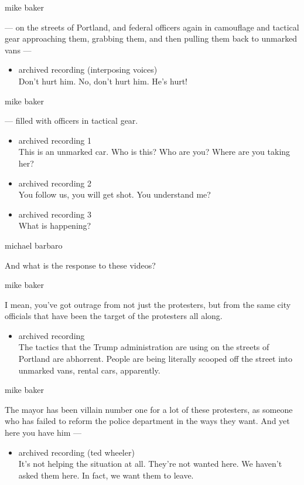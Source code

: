 mike baker

--- on the streets of Portland, and federal officers again in camouflage
and tactical gear approaching them, grabbing them, and then pulling them
back to unmarked vans ---

\begin{itemize}
\tightlist
\item
  archived recording (interposing voices)\\
  Don't hurt him. No, don't hurt him. He's hurt!
\end{itemize}

mike baker

--- filled with officers in tactical gear.

\begin{itemize}
\item
  archived recording 1\\
  This is an unmarked car. Who is this? Who are you? Where are you
  taking her?
\item
  archived recording 2\\
  You follow us, you will get shot. You understand me?
\item
  archived recording 3\\
  What is happening?
\end{itemize}

michael barbaro

And what is the response to these videos?

mike baker

I mean, you've got outrage from not just the protesters, but from the
same city officials that have been the target of the protesters all
along.

\begin{itemize}
\tightlist
\item
  archived recording\\
  The tactics that the Trump administration are using on the streets of
  Portland are abhorrent. People are being literally scooped off the
  street into unmarked vans, rental cars, apparently.
\end{itemize}

mike baker

The mayor has been villain number one for a lot of these protesters, as
someone who has failed to reform the police department in the ways they
want. And yet here you have him ---

\begin{itemize}
\tightlist
\item
  archived recording (ted wheeler)\\
  It's not helping the situation at all. They're not wanted here. We
  haven't asked them here. In fact, we want them to leave.
\end{itemize}

